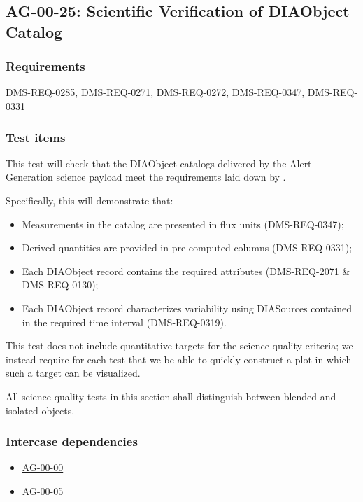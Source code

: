 \subsection{AG-00-25: Scientific Verification of DIAObject Catalog}
\label{AG-00-25}

\subsubsection{Requirements}

DMS-REQ-0285, DMS-REQ-0271, DMS-REQ-0272, DMS-REQ-0347, DMS-REQ-0331

\subsubsection{Test items}
\label{ag-00-25-items}

This test will check that the DIAObject catalogs delivered by the Alert
Generation science
payload meet the requirements laid down by .

Specifically, this will demonstrate that:

\begin{itemize}

  \item{Measurements in the catalog are presented in flux units
  (DMS-REQ-0347);}
  \item{Derived quantities are provided in pre-computed columns
  (DMS-REQ-0331);}
\item{Each DIAObject record contains the required attributes (DMS-REQ-2071 \&
	DMS-REQ-0130);}
\item{Each DIAObject record characterizes variability using
	DIASources contained in the required time interval
	(DMS-REQ-0319).}
\end{itemize}

This test does not include quantitative targets for the science quality criteria; we instead require for each test that we be able to quickly construct a plot in which such a target can be visualized.

All science quality tests in this section shall distinguish between blended and isolated objects.

\subsubsection{Intercase dependencies}

\begin{itemize}

  \item{\hyperref[ag-00-00]{AG-00-00}}
  \item{\hyperref[ag-00-05]{AG-00-05}}

\end{itemize}

